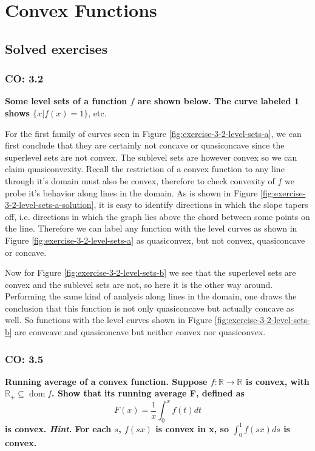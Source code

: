 \section{Convex Functions}
\subsection{Solved exercises}
\subsubsection{CO: 3.2}
\textbf{Some level sets of a function $f$ are shown below. The curve labeled 1 shows $\{x | f(x) = 1\}$}, etc.



For the first family of curves seen in Figure \ref{fig:exercise-3-2-level-sets-a}, we can first conclude that they are certainly not concave or quasiconcave since the superlevel sets are not convex.
The sublevel sets are however convex so we can claim quasiconvexity.
Recall the restriction of a convex function to any line through it's domain must also be convex, therefore to check convexity of $f$ we probe it's behavior along lines in the domain.
As is shown in Figure \ref{fig:exercise-3-2-level-sets-a-solution}, it is easy to identify directions in which the slope tapers off,
i.e. directions in which the graph lies above the chord between some points on the line.
Therefore we can label any function with the level curves as shown in Figure \ref{fig:exercise-3-2-level-sets-a} as quasiconvex, but not convex, quasiconcave or concave.


Now for Figure \ref{fig:exercise-3-2-level-sets-b} we see that the superlevel sets are convex and the sublevel sets are not, so here it is the other way around.
Performing the same kind of analysis along lines in the domain, one draws the conclusion that this function is not only quasiconcave but actually concave as well.
So functions with the level curves shown in Figure \ref{fig:exercise-3-2-level-sets-b} are convcave and quasiconcave but neither convex nor quasiconvex.

\subsubsection{CO: 3.5}
\textbf{Running average of a convex function. Suppose $f: \mathbb{R} \to \mathbb{R}$ is convex, with $\mathbb{R}_+ \subseteq \operatorname{dom}f$. Show that its running average F, defined as}
\[
    F(x) = \frac{1}{x}\int_0^xf(t)dt
\]
\textbf{is convex. \textit{Hint}. For each $s$, $f(sx)$ is convex in x, so $\int_0^1 f(sx)ds$ is convex.}

